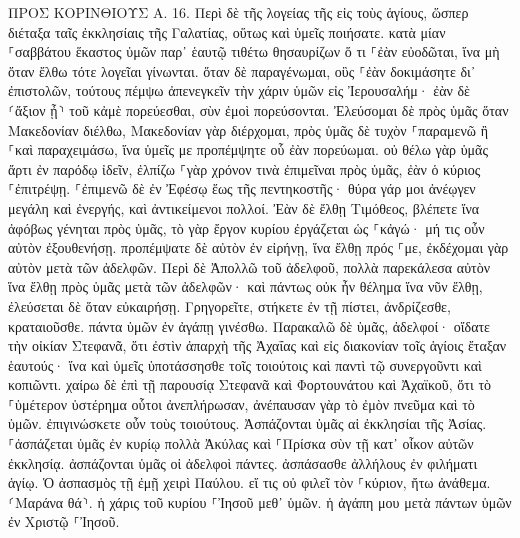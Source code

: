 \documentclass[twoside, 9pt]{extreport}
\begin{document}
ΠΡΟΣ ΚΟΡΙΝΘΙΟΥΣ Α.
16.
Περὶ δὲ τῆς λογείας τῆς εἰς τοὺς ἁγίους, ὥσπερ διέταξα ταῖς ἐκκλησίαις τῆς Γαλατίας, οὕτως καὶ ὑμεῖς ποιήσατε. 
κατὰ μίαν ⸀σαββάτου ἕκαστος ὑμῶν παρ᾽ ἑαυτῷ τιθέτω θησαυρίζων ὅ τι ⸀ἐὰν εὐοδῶται, ἵνα μὴ ὅταν ἔλθω τότε λογεῖαι γίνωνται. 
ὅταν δὲ παραγένωμαι, οὓς ⸀ἐὰν δοκιμάσητε δι᾽ ἐπιστολῶν, τούτους πέμψω ἀπενεγκεῖν τὴν χάριν ὑμῶν εἰς Ἰερουσαλήμ· 
ἐὰν δὲ ⸂ἄξιον ᾖ⸃ τοῦ κἀμὲ πορεύεσθαι, σὺν ἐμοὶ πορεύσονται. 
Ἐλεύσομαι δὲ πρὸς ὑμᾶς ὅταν Μακεδονίαν διέλθω, Μακεδονίαν γὰρ διέρχομαι, 
πρὸς ὑμᾶς δὲ τυχὸν ⸀παραμενῶ ἢ ⸀καὶ παραχειμάσω, ἵνα ὑμεῖς με προπέμψητε οὗ ἐὰν πορεύωμαι. 
οὐ θέλω γὰρ ὑμᾶς ἄρτι ἐν παρόδῳ ἰδεῖν, ἐλπίζω ⸀γὰρ χρόνον τινὰ ἐπιμεῖναι πρὸς ὑμᾶς, ἐὰν ὁ κύριος ⸀ἐπιτρέψῃ. 
⸀ἐπιμενῶ δὲ ἐν Ἐφέσῳ ἕως τῆς πεντηκοστῆς· 
θύρα γάρ μοι ἀνέῳγεν μεγάλη καὶ ἐνεργής, καὶ ἀντικείμενοι πολλοί. 
Ἐὰν δὲ ἔλθῃ Τιμόθεος, βλέπετε ἵνα ἀφόβως γένηται πρὸς ὑμᾶς, τὸ γὰρ ἔργον κυρίου ἐργάζεται ὡς ⸀κἀγώ· 
μή τις οὖν αὐτὸν ἐξουθενήσῃ. προπέμψατε δὲ αὐτὸν ἐν εἰρήνῃ, ἵνα ἔλθῃ πρός ⸀με, ἐκδέχομαι γὰρ αὐτὸν μετὰ τῶν ἀδελφῶν. 
Περὶ δὲ Ἀπολλῶ τοῦ ἀδελφοῦ, πολλὰ παρεκάλεσα αὐτὸν ἵνα ἔλθῃ πρὸς ὑμᾶς μετὰ τῶν ἀδελφῶν· καὶ πάντως οὐκ ἦν θέλημα ἵνα νῦν ἔλθῃ, ἐλεύσεται δὲ ὅταν εὐκαιρήσῃ. 
Γρηγορεῖτε, στήκετε ἐν τῇ πίστει, ἀνδρίζεσθε, κραταιοῦσθε. 
πάντα ὑμῶν ἐν ἀγάπῃ γινέσθω. 
Παρακαλῶ δὲ ὑμᾶς, ἀδελφοί· οἴδατε τὴν οἰκίαν Στεφανᾶ, ὅτι ἐστὶν ἀπαρχὴ τῆς Ἀχαΐας καὶ εἰς διακονίαν τοῖς ἁγίοις ἔταξαν ἑαυτούς· 
ἵνα καὶ ὑμεῖς ὑποτάσσησθε τοῖς τοιούτοις καὶ παντὶ τῷ συνεργοῦντι καὶ κοπιῶντι. 
χαίρω δὲ ἐπὶ τῇ παρουσίᾳ Στεφανᾶ καὶ Φορτουνάτου καὶ Ἀχαϊκοῦ, ὅτι τὸ ⸀ὑμέτερον ὑστέρημα οὗτοι ἀνεπλήρωσαν, 
ἀνέπαυσαν γὰρ τὸ ἐμὸν πνεῦμα καὶ τὸ ὑμῶν. ἐπιγινώσκετε οὖν τοὺς τοιούτους. 
Ἀσπάζονται ὑμᾶς αἱ ἐκκλησίαι τῆς Ἀσίας. ⸀ἀσπάζεται ὑμᾶς ἐν κυρίῳ πολλὰ Ἀκύλας καὶ ⸀Πρίσκα σὺν τῇ κατ᾽ οἶκον αὐτῶν ἐκκλησίᾳ. 
ἀσπάζονται ὑμᾶς οἱ ἀδελφοὶ πάντες. ἀσπάσασθε ἀλλήλους ἐν φιλήματι ἁγίῳ. 
Ὁ ἀσπασμὸς τῇ ἐμῇ χειρὶ Παύλου. 
εἴ τις οὐ φιλεῖ τὸν ⸀κύριον, ἤτω ἀνάθεμα. ⸂Μαράνα θά⸃. 
ἡ χάρις τοῦ κυρίου ⸀Ἰησοῦ μεθ᾽ ὑμῶν. 
ἡ ἀγάπη μου μετὰ πάντων ὑμῶν ἐν Χριστῷ ⸀Ἰησοῦ. 
\end{document}

